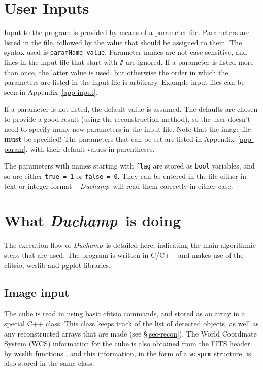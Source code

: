 \documentclass[12pt,a4paper]{article}
\newcommand{\duchamp}{\emph{Duchamp}}
\begin{document}
\section{User Inputs}
\label{sec-param}

Input to the program is provided by means of a parameter
file. Parameters are listed in the file, followed by the value that
should be assigned to them. The syntax used is \texttt{paramName
value}. Parameter names are not case-sensitive, and lines in the input
file that start with \texttt{\#} are ignored. If a parameter is listed
more than once, the latter value is used, but otherwise the order in
which the parameters are listed in the input file is
arbitrary. Example input files can be seen in
Appendix~\ref{app-input}.

If a parameter is not listed, the default value is assumed. The
defaults are chosen to provide a good result (using the reconstruction
method), so the user doesn't need to specify many new parameters in
the input file. Note that the image file \textbf{must} be specified! The
parameters that can be set are listed in Appendix~\ref{app-param},
with their default values in parentheses.

The parameters with names starting with \texttt{flag} are stored as
\texttt{bool} variables, and so are either \texttt{true = 1} or
\texttt{false = 0}. They can be entered in the file either in text or
integer format -- \duchamp\ will read them correctly in either case. 

\section{What \duchamp\ is doing}
\label{sec-flow}

The execution flow of \duchamp\ is detailed here, indicating the
main algorithmic steps that are used. The program is written in C/C++
and makes use of the {\sc cfitsio}, {\sc wcslib} and {\sc pgplot}
libraries. 

\subsection{Image input}
\label{sec-input}

The cube is read in using basic {\sc cfitsio} commands, and stored as
an array in a special C++ class. This class keeps track of
the list of detected objects, as well as any reconstructed arrays that
are made (see \S\ref{sec-recon}). The World Coordinate System (WCS)
information for the cube is also obtained from the FITS header by {\sc
wcslib} functions \citep{greisen02, calabretta02}, and this
information, in the form of a \texttt{wcsprm} structure, is also stored
in the same class.
\end{document}
